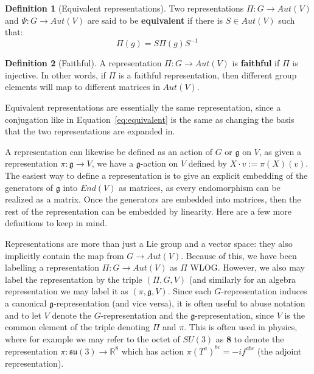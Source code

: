 \documentclass[11pt, oneside]{article}   	%
\theoremstyle{definition}
\newtheorem{definition}{Definition}[section]
\begin{document}
\begin{definition}[Equivalent representations]
	Two representations $\Pi : G\rightarrow Aut(V)$ and $\Psi : G\rightarrow Aut(V)$ are said to be 
	\textbf{equivalent} if there is $S\in Aut(V)$ such that:
	\begin{equation}
		\Pi(g) = S\Pi(g) S^{-1}~
		\label{eq:equivalent}
	\end{equation}
\end{definition}

\begin{definition}[Faithful]
	A representation $\Pi : G\rightarrow Aut(V)$ is \textbf{faithful} if $\Pi$ is injective. In other words, if 
	$\Pi$ is a faithful representation, then different group elements will map to different matrices in 
	$Aut(V)$. 
\end{definition}

Equivalent representations are essentially the same representation, since a conjugation like in 
Equation~\ref{eq:equivalent} is the same as changing the basis that the two representations are 
expanded in. 

 A representation can likewise be defined as an action of $G$ or $\mathfrak g$ on $V$, as given a 
representation $\pi : \mathfrak g\rightarrow V$, we have a $\mathfrak g$-action on $V$ defined 
by $X\cdot v := \pi(X)(v)$. The easiest way to define a representation is to give an explicit 
embedding of the generators of $\mathfrak g$ into $End(V)$ as matrices, as every endomorphism 
can be realized as a matrix. Once the generators are embedded into matrices, then the rest of 
the representation can be embedded by linearity. Here are a few more definitions to keep in mind. 

Representations are more than just a Lie group and a vector space: they also implicitly contain the 
map from $G\rightarrow Aut(V)$. Because of this, we have been labelling a representation $\Pi : G\rightarrow 
Aut(V)$ as $\Pi$ WLOG. However, we also may label the representation by the triple $(\Pi, G, V)$ 
(and similarly for an algebra representation we may label it as $(\pi, \mathfrak g, V)$. Since each 
$G$-representation induces a canonical $\mathfrak g$-representation (and vice versa), it is often 
useful to abuse notation and to let $V$ denote the $G$-representation and the $\mathfrak g$-representation, 
since $V$ is the common element of the triple denoting $\Pi$ and $\pi$. This is often used in physics, where 
for example we may refer to the octet of $SU(3)$ as $\textbf{8}$ to denote the representation $\pi : \mathfrak{su}(3)
\rightarrow\mathbb R^8$ which has action $\pi(T^a)^{bc} = - if^{abc}$ (the adjoint representation).  
\end{document}
